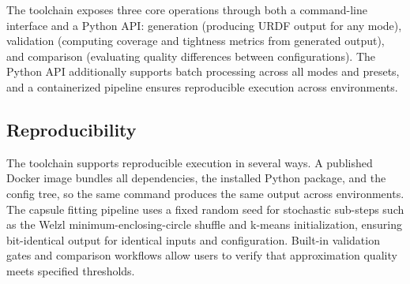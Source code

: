 The toolchain exposes three core operations through both a command-line interface and a Python API: generation (producing URDF output for any mode), validation (computing coverage and tightness metrics from generated output), and comparison (evaluating quality differences between configurations). The Python API additionally supports batch processing across all modes and presets, and a containerized pipeline ensures reproducible execution across environments.

\subsection{Reproducibility}

The toolchain supports reproducible execution in several ways.
A published Docker image bundles all dependencies, the installed Python package, and the config tree, so the same command produces the same output across environments.
The capsule fitting pipeline uses a fixed random seed for stochastic sub-steps such as the Welzl minimum-enclosing-circle shuffle and k-means initialization, ensuring bit-identical output for identical inputs and configuration.
Built-in validation gates and comparison workflows allow users to verify that approximation quality meets specified thresholds.
